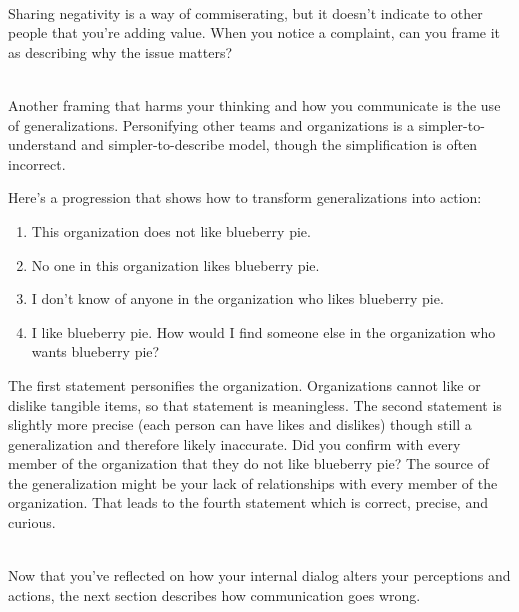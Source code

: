 \ \\
Sharing negativity is a way of commiserating, but it doesn't indicate to other people that you're adding value.  
When you notice a complaint, can you frame it as describing why the issue matters? 

\ \\

Another framing that harms your thinking and how you communicate is the use of generalizations. Personifying other teams and organizations is a simpler-to-understand and simpler-to-describe model, though the simplification is often incorrect. 

Here's a progression that shows how to transform generalizations into action: 
%
%
\begin{enumerate}
    \item This organization does not like blueberry pie.
    \item No one in this organization likes blueberry pie.
    \item I don't know of anyone in the organization who likes blueberry pie.
    \item I like blueberry pie. How would I find someone else in the organization who wants blueberry pie?
\end{enumerate}
The first statement personifies the organization. Organizations cannot like or dislike tangible items, so that statement is meaningless. The second statement is slightly more precise (each person can have likes and dislikes) though still a generalization and therefore likely inaccurate. Did you confirm with every member of the organization that they do not like blueberry pie? The source of the generalization might be your lack of relationships with every member of the organization. That leads to the fourth statement which is correct, precise, and curious. 

\ \\

Now that you've reflected on how your internal dialog alters your perceptions and actions, the next section describes how communication goes wrong.